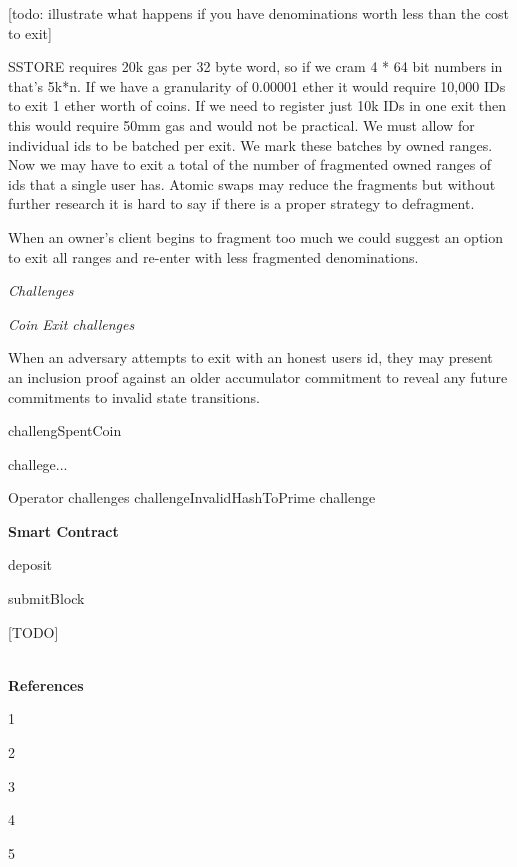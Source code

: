 \documentclass[11pt]{article}
\begin{document}
[todo: illustrate what happens if you have denominations worth less than the cost to exit]

SSTORE requires 20k gas per 32 byte word, so if we cram 4 * 64 bit numbers in that’s 5k*n. If we have a granularity of 0.00001 ether it would require 10,000 IDs to exit 1 ether worth of coins. If we need to register just 10k IDs in one exit then this would require 50mm gas and would not be practical. We must allow for individual ids to be batched per exit. We mark these batches by owned ranges. Now we may have to exit a total of the number of fragmented owned ranges of ids that a single user has. Atomic swaps may reduce the fragments but without further research it is hard to say if there is a proper strategy to defragment. 

When an owner’s client begins to fragment too much we could suggest an option to exit all ranges and re-enter with less fragmented denominations.

\centerline{\textit{Challenges}}

\centerline{\textit{Coin Exit challenges}}

When an adversary attempts to exit with an honest users id, they may present an inclusion proof against an older accumulator commitment to reveal any future commitments to invalid state transitions. 

challengSpentCoin

challege...

Operator challenges
challengeInvalidHashToPrime
challenge

\centerline{\textbf{Smart Contract}}

deposit

submitBlock

[TODO]
\\
\\
\centerline{\textbf{References}}

1 \url{}

2 \url{}

3 \url{}

4 \url{}

5 \url{}
\end{document}
